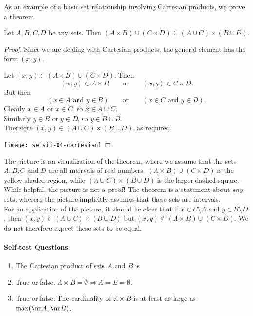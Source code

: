 As an example of a basic set relationship involving Cartesian products, we prove a theorem.

\begin{thm}\label{thm:cartex}
Let $A,B,C,D$ be any sets. Then $(A\times B)\cup(C\times D)\subseteq(A\cup C)\times(B\cup D)$.
\end{thm}

\begin{proof}
Since we are dealing with Cartesian products, the general element has the form $(x,y)$.\\
\noindent\begin{minipage}{0.65\textwidth}
Let $(x,y)\in(A\times B)\cup(C\times D)$. Then 
\[(x,y)\in A\times B\qquad \text{or}\qquad (x,y)\in C\times D.\]
But then
\[(x\in A\text{ and }y\in B)\qquad\text{or}\qquad(x\in C\text{ and }y\in D).\]
Clearly $x\in A$ or $x\in C$, so $x\in A\cup C$.\\
Similarly $y\in B$ or $y\in D$, so $y\in B\cup D$.\\
Therefore $(x,y)\in (A\cup C)\times(B\cup D)$, as required.
\end{minipage}
\qquad
\begin{minipage}{0.28\textwidth}
\centering
\texttt{[image: setsii-04-cartesian]}
\end{minipage}
\end{proof}

\noindent The picture is an visualization of the theorem, where we assume that the sets $A,B,C$ and $D$ are all intervals of real numbers. $(A\times B)\cup(C\times D)$ is the yellow shaded region, while $(A\cup C)\times(B\cup D)$ is the larger dashed square. While helpful, the picture is not a proof! The theorem is a statement about \emph{any} sets, whereas the picture implicitly assumes that these sets are intervals.\\
For an application of the picture, it should be clear that if $x\in C\setminus A$ and $y\in B\setminus D$, then $(x,y)\in (A\cup C)\times (B\cup D)$ but $(x,y)\not\in (A\times B)\cup(C\times D)$. We do not therefore expect these sets to be equal.

\paragraph{Self-test Questions}

	\begin{enumerate}
    \item The Cartesian product of sets $A$ and $B$ is \underline{}
    \item True or false: $A\times B=\emptyset\iff A=B=\emptyset$.
    \item True or false: The cardinality of $A\times B$ is at least as large as $\max(\nm A,\nm B)$.
  \end{enumerate}

